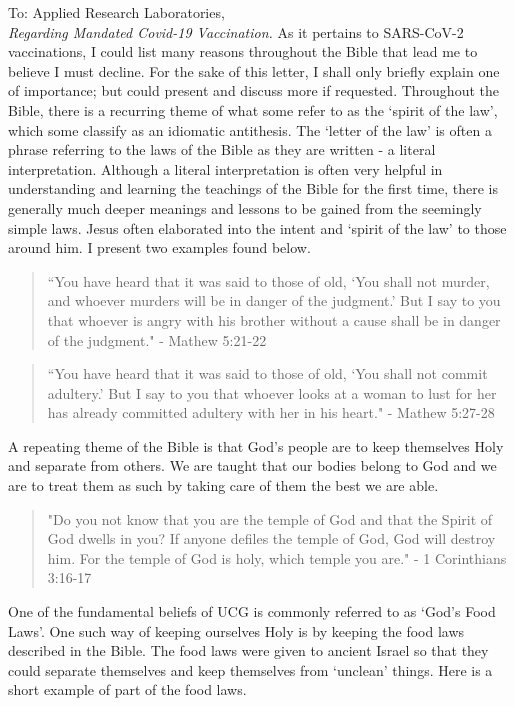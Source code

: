 \documentclass[]{letter}
\begin{document}
\begin{letter}{To: Applied Research Laboratories,\\ \textit{Regarding Mandated Covid-19 Vaccination.}}
\hspace{1cm}As it pertains to SARS-CoV-2 vaccinations, I could list many reasons throughout the Bible that lead me to believe I must decline. For the sake of this letter, I shall only briefly explain one of importance; but could present and discuss more if requested. Throughout the Bible, there is a recurring theme of what some refer to as the `spirit of the law', which some classify as an idiomatic antithesis. The `letter of the law' is often a phrase referring to the laws of the Bible as they are written - a literal interpretation. Although a literal interpretation is often very helpful in understanding and learning the teachings of the Bible for the first time, there is generally much deeper meanings and lessons to be gained from the seemingly simple laws. Jesus often elaborated into the intent and `spirit of the law' to those around him. I present two examples found below.

\begin{quotation}
	``You have heard that it was said to those of old, `You shall not murder, and whoever murders will be in danger of the judgment.' But I say to you that whoever is angry with his brother without a cause shall be in danger of the judgment." - Mathew 5:21-22
\end{quotation}

\begin{quotation}
	``You have heard that it was said to those of old, `You shall not commit adultery.’ But I say to you that whoever looks at a woman to lust for her has already committed adultery with her in his heart." - Mathew 5:27-28
\end{quotation}

\hspace{1cm}A repeating theme of the Bible is that God's people are to keep themselves Holy and separate from others. We are taught that our bodies belong to God and we are to treat them as such by taking care of them the best we are able. 

\begin{quotation}
	"Do you not know that you are the temple of God and that the Spirit of God dwells in you? If anyone defiles the temple of God, God will destroy him. For the temple of God is holy, which temple you are." - 1 Corinthians 3:16-17
\end{quotation}

\hspace{1cm}One of the fundamental beliefs of UCG is commonly referred to as `God's Food Laws'. One such way of keeping ourselves Holy is by keeping the food laws described in the Bible. The food laws were given to ancient Israel so that they could separate themselves and keep themselves from `unclean' things. Here is a short example of part of the food laws.


\end{letter}
\end{document}
